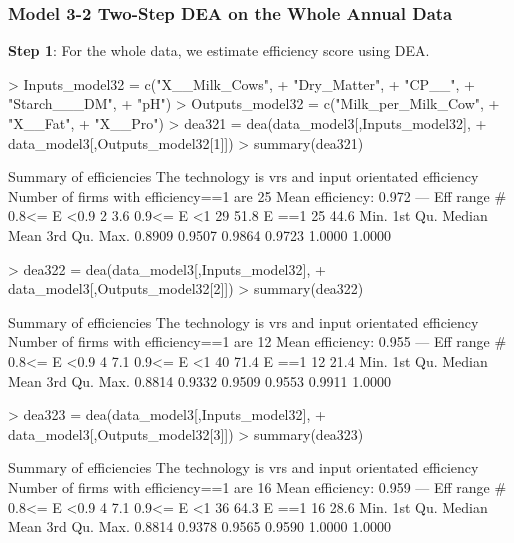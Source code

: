 \documentclass[12pt,]{article}
\begin{document}
\subsubsection{Model 3-2 Two-Step DEA on the Whole Annual Data}
\textbf{Step 1}: For the whole data, we estimate efficiency score using DEA.
\begin{Schunk}
\begin{Sinput}
> Inputs_model32 = c("X__Milk_Cows", 
+                   "Dry_Matter", 
+                   "CP__", 
+                   "Starch___DM", 
+                   "pH")
> Outputs_model32 = c("Milk_per_Milk_Cow",
+                    "X__Fat",
+                    "X__Pro")
> dea321 = dea(data_model3[,Inputs_model32],
+                  data_model3[,Outputs_model32[1]])
> summary(dea321)
\end{Sinput}
\begin{Soutput}
Summary of efficiencies
The technology is vrs and input orientated efficiency
Number of firms with efficiency==1 are 25 
Mean efficiency: 0.972 
---                
  Eff range       #    %
  0.8<= E <0.9    2  3.6
  0.9<= E <1     29 51.8
        E ==1    25 44.6
   Min. 1st Qu.  Median    Mean 3rd Qu.    Max. 
 0.8909  0.9507  0.9864  0.9723  1.0000  1.0000 
\end{Soutput}
\begin{Sinput}
> dea322 = dea(data_model3[,Inputs_model32],
+                  data_model3[,Outputs_model32[2]])
> summary(dea322)
\end{Sinput}
\begin{Soutput}
Summary of efficiencies
The technology is vrs and input orientated efficiency
Number of firms with efficiency==1 are 12 
Mean efficiency: 0.955 
---                
  Eff range       #    %
  0.8<= E <0.9    4  7.1
  0.9<= E <1     40 71.4
        E ==1    12 21.4
   Min. 1st Qu.  Median    Mean 3rd Qu.    Max. 
 0.8814  0.9332  0.9509  0.9553  0.9911  1.0000 
\end{Soutput}
\begin{Sinput}
> dea323 = dea(data_model3[,Inputs_model32],
+                  data_model3[,Outputs_model32[3]])
> summary(dea323)
\end{Sinput}
\begin{Soutput}
Summary of efficiencies
The technology is vrs and input orientated efficiency
Number of firms with efficiency==1 are 16 
Mean efficiency: 0.959 
---                
  Eff range       #    %
  0.8<= E <0.9    4  7.1
  0.9<= E <1     36 64.3
        E ==1    16 28.6
   Min. 1st Qu.  Median    Mean 3rd Qu.    Max. 
 0.8814  0.9378  0.9565  0.9590  1.0000  1.0000 
\end{Soutput}
\end{Schunk}
\end{document}
